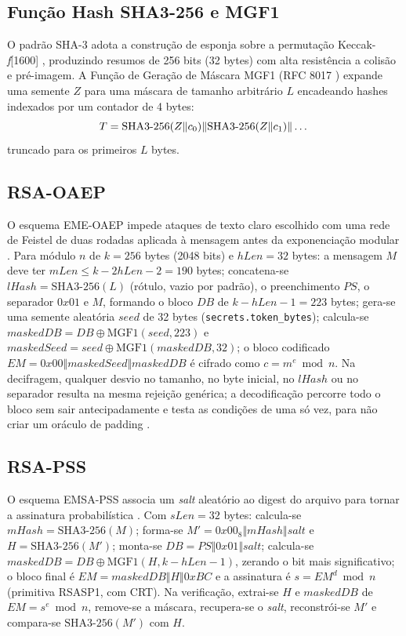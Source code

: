 \documentclass[conference]{IEEEtran}
\begin{document}
\subsection{Função Hash SHA3-256 e MGF1}

O padrão SHA-3 adota a construção de esponja sobre a permutação
Keccak-\textit{f}[1600] \cite{fips202}, produzindo resumos de 256 bits (32
bytes) com alta resistência a colisão e pré-imagem. A Função de Geração de
Máscara MGF1 (RFC 8017 \cite{rfc8017}) expande uma semente $Z$ para uma
máscara de tamanho arbitrário $L$ encadeando hashes indexados por um
contador de 4 bytes:
\begin{equation}
T = \text{SHA3\text{-}256}(Z \Vert c_0) \Vert \text{SHA3\text{-}256}(Z \Vert c_1) \Vert \dots
\end{equation}
truncado para os primeiros $L$ bytes.

\subsection{RSA-OAEP}

O esquema EME-OAEP impede ataques de texto claro escolhido com uma rede de
Feistel de duas rodadas aplicada à mensagem antes da exponenciação modular
\cite{rfc8017}. Para módulo $n$ de $k=256$ bytes (2048 bits) e
$hLen = 32$ bytes: a mensagem $M$ deve ter
$mLen \le k - 2hLen - 2 = 190$ bytes; concatena-se
$lHash = \text{SHA3-256}(L)$ (rótulo, vazio por padrão), o preenchimento
$PS$, o separador $0x01$ e $M$, formando o bloco $DB$ de $k-hLen-1=223$
bytes; gera-se uma semente aleatória $seed$ de 32 bytes
(\texttt{secrets.token\_bytes}); calcula-se
$maskedDB = DB \oplus \text{MGF1}(seed, 223)$ e
$maskedSeed = seed \oplus \text{MGF1}(maskedDB, 32)$; o bloco codificado
$EM = 0x00 \Vert maskedSeed \Vert maskedDB$ é cifrado como
$c = m^e \bmod n$. Na decifragem, qualquer desvio no tamanho, no byte
inicial, no $lHash$ ou no separador resulta na mesma rejeição genérica;
a decodificação percorre todo o bloco sem sair antecipadamente e testa as
condições de uma só vez, para não criar um oráculo de padding
\cite{manger01}.

\subsection{RSA-PSS}

O esquema EMSA-PSS associa um \textit{salt} aleatório ao digest do arquivo
para tornar a assinatura probabilística \cite{fips1865}. Com
$sLen = 32$ bytes: calcula-se $mHash = \text{SHA3-256}(M)$; forma-se
$M' = 0x00_8 \Vert mHash \Vert salt$ e $H = \text{SHA3-256}(M')$; monta-se
$DB = PS \Vert 0x01 \Vert salt$; calcula-se
$maskedDB = DB \oplus \text{MGF1}(H, k-hLen-1)$, zerando o bit mais
significativo; o bloco final é $EM = maskedDB \Vert H \Vert 0xBC$ e a
assinatura é $s = EM^d \bmod n$ (primitiva RSASP1, com CRT). Na
verificação, extrai-se $H$ e $maskedDB$ de $EM = s^e \bmod n$, remove-se a
máscara, recupera-se o \textit{salt}, reconstrói-se $M'$ e compara-se
$\text{SHA3-256}(M')$ com $H$.
\end{document}
